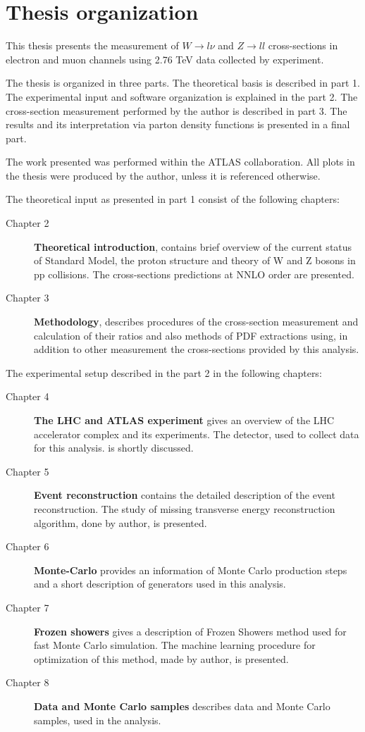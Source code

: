 \chapter{Thesis organization}
This thesis presents the measurement of $W\to l\nu$ and $Z\to ll$ cross-sections in electron and muon channels using 2.76 TeV data collected by \atlas experiment.

The thesis is organized in three parts. The theoretical basis is described in part 1. The experimental input and software organization is explained in the part 2. The cross-section measurement performed by the author is described in part 3. The results and its interpretation via parton density functions is presented in a final part.

The work presented was performed within the ATLAS collaboration. All plots in the thesis were produced by the author, unless it is referenced otherwise. 

The theoretical input as presented in part 1 consist of the following chapters:
\begin{description}
\item [Chapter 2] \textbf{Theoretical introduction}, contains brief overview of the current status of Standard Model, the proton structure and theory of W and Z bosons in pp collisions. The cross-sections predictions at NNLO order are presented.
\item [Chapter 3] \textbf{Methodology}, describes procedures of the cross-section measurement and calculation of their ratios and also methods of PDF extractions using, in addition to other measurement the cross-sections provided by this analysis.
\end{description}

The experimental setup described in the part 2 in the following chapters:
\begin{description}
\item [Chapter 4] \textbf{The LHC and ATLAS experiment} gives an overview of the LHC accelerator complex and its experiments. The \atlas detector, used to collect data for this analysis. is shortly discussed.
\item [Chapter 5] \textbf{Event reconstruction} contains the detailed description of the event reconstruction. The study of missing transverse energy reconstruction algorithm, done by author, is presented.
\item [Chapter 6] \textbf{Monte-Carlo} provides an information of Monte Carlo production steps and a short description of generators used in this analysis.
\item [Chapter 7] \textbf{Frozen showers} gives a description of Frozen Showers method used for fast Monte Carlo simulation. The machine learning procedure for optimization of this method, made by author, is presented.
\item [Chapter 8] \textbf{Data and Monte Carlo samples} describes data and Monte Carlo samples, used in the analysis.
\end{description}


